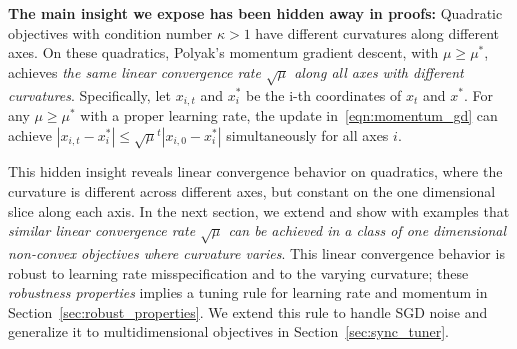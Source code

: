 \documentclass{article} %
\newcommand{\yell}[1]{#1}
\begin{document}
{\bf The main insight we expose has been hidden away in proofs:}
%
Quadratic objectives with condition number $\kappa > 1$ have different curvatures along different axes. On these quadratics, 
Polyak's momentum gradient descent, with $\mu \geq \mu^*$, achieves \emph{the same linear convergence rate $\sqrt{\mu}$ along all axes with different curvatures}. Specifically, let $x_{i, t}$ and $x_i^*$ be the i-th coordinates of $x_t$ and $x^*\!$.
For any $\mu \geq \mu^*$ with a proper learning rate, the update in~\eqref{eqn:momentum_gd} can achieve $| x_{i, t} - x_i^* | \leq \sqrt{\mu}^t | x_{i,0} - x_i^* |$ simultaneously for all axes $i$.

This hidden insight reveals linear convergence behavior on quadratics, where the curvature is different across different axes, but constant on the one dimensional slice along each axis. In the next section, we extend and show with examples that \emph{similar linear convergence rate $\sqrt{\mu}$ can be achieved in a class of one dimensional non-convex objectives where curvature varies}. This linear convergence behavior is robust to learning rate misspecification and to the varying curvature; these \emph{robustness properties} implies a tuning rule for learning rate and momentum in Section~\ref{sec:robust_properties}. We extend this rule to handle SGD noise  and generalize it to multidimensional objectives in Section~\ref{sec:sync_tuner}.
\end{document}
